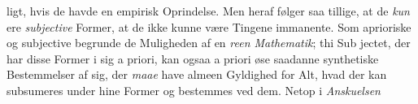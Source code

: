 \documentclass[12pt,a4paper]{book}
\begin{document}
ligt, hvis de havde en empirisk Oprindelse. Men heraf følger
saa tillige, at de \emph{kun} ere \emph{subjective} Former, at de ikke
kunne være Tingene immanente. Som aprioriske og subjective
begrunde de Muligheden af en \emph{reen Mathematik}; thi Sub\-%
jectet, der har disse Former i sig a priori, kan ogsaa a priori
øse saadanne synthetiske Bestemmelser af sig, der \emph{maae} have
almeen Gyldighed for Alt, hvad der kan subsumeres under
hine Former og bestemmes ved dem. Netop i \emph{Anskuelsen}
\end{document}

